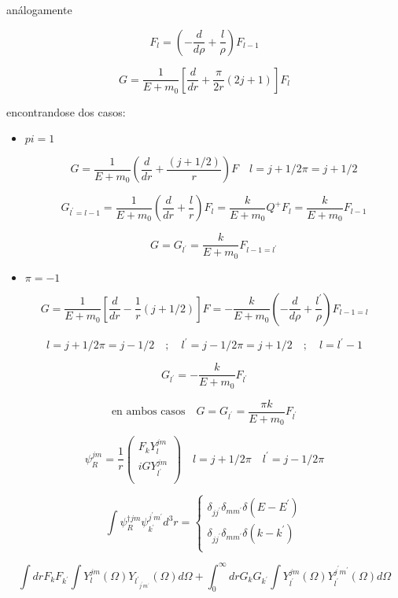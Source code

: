 \documentclass{report}
\begin{document}
análogamente

\begin{equation}
F_l = (- \frac{d}{d\rho} + \frac{l}{\rho})F_{l-1}
\end{equation}

\[G = \frac{1}{E+m_0 } [\frac{d}{dr} + \frac{\pi}{2r} (2j+1)] F_l \]

encontrandose dos casos:

\begin{itemize}
\item $pi = 1$

\[G = \frac{1}{E+m_0 } (\frac{d}{dr} + \frac{(j+1/2)}{r}) F \quad l = j + 1/2 \pi = j+1/2 \]

\[G_{l^{\prime} = l-1} = \frac{1}{E+m_0 } (\frac{d}{dr} + \frac{l}{r})F_l = \frac{k}{E+m_0 } Q^+ F_l = \frac{k}{E+m_0 } F_{l-1}\]

\[G = G_{l^{\prime}} = \frac{k}{E+m_0 } F_{l-1=l^{\prime }}\]

\item $\pi = -1$
\end{itemize}

\[G = \frac{1}{E+m_0 }[ \frac{d}{dr} - \frac{1}{r}(j+1/2)] F = - \frac{k}{E+m_0 } (-\frac{d}{d\rho } + \frac{l^{\prime}}{\rho})F_{l-1=l}\]

\[l = j +1/2 \pi = j-1/2 \quad ; \quad l^{\prime} = j-1/2 \pi = j +1/2 \quad ; \quad l = l^{\prime} -1\]

\[G_{l^{\prime}} = - \frac{k}{E+m_0 } F_{l^{\prime}}\]

\[\text{en ambos casos} \quad G = G_{l^{\prime}} = \frac{\pi k}{E + m_0 } F_{l^{\prime}}\]

\[\psi _{R}^{jm} = \frac{1}{r} \left ( \begin{array}{cc}
 F_{k}Y_{l}^{jm}   \\
 iG Y_{l^{\prime}}^{jm}   \\
 \end{array} \right) \quad l = j+1/2 \pi \quad l^{\prime} = j -1/2 \pi \]

\[\int \psi _{R}^{\dagger jm} \psi _{k^{\prime}}^{j^{\prime}m^{\prime}} d^3 r = \begin{cases}
    \delta_{j j^{\prime}} \delta_{m m^{\prime}} \delta (E-E^{\prime})\\
    \delta _{jj^{\prime}} \delta_{mm^{\prime}} \delta (k-k^{\prime})\\
  \end{cases}\]

\[\int dr F_{k} F_{k^{\prime }} \int Y_{l}^{jm}(\Omega ) Y_{l^{\prime }}_{j^{\prime } m^{\prime }}(\Omega ) d \Omega + \int _{0}^{\infty } dr G_{k} G_{k^{\prime }} \int Y_{l^{\prime }}^{jm}(\Omega ) Y_{l^{\prime }}^{j^{\prime } m^{\prime }} (\Omega ) d \Omega \]
\end{document}
